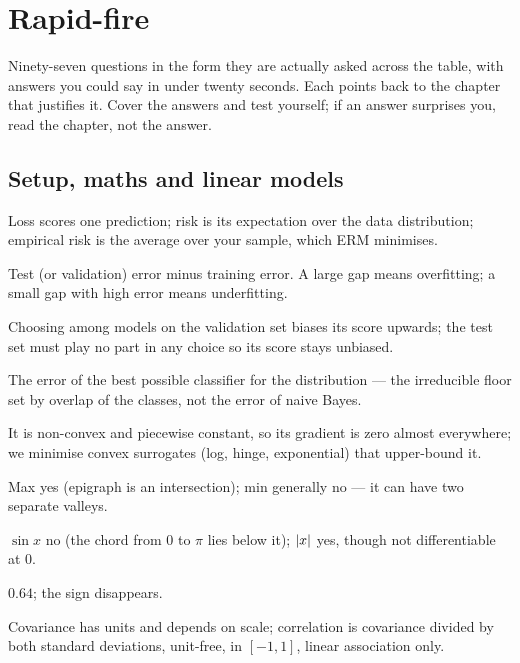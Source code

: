 \chapter{Rapid-fire}
\label{ch:rapid}
Ninety-seven questions in the form they are actually asked across the table, with answers you could say in under
twenty seconds. Each points back to the chapter that justifies it. Cover the answers and test yourself; if an
answer surprises you, read the chapter, not the answer.


{\small
	\section{Setup, maths and linear models}

	 Loss scores one prediction; risk is its expectation over the data distribution;
	empirical risk is the average over your sample, which ERM minimises.

	 Test (or validation) error minus training error. A large gap means
	overfitting; a small gap with high error means underfitting.

	 Choosing among models on the validation set biases its score upwards;
	the test set must play no part in any choice so its score stays unbiased.

	 The error of the best possible classifier for the distribution --- the irreducible
	floor set by overlap of the classes, not the error of naive Bayes.

	 It is non-convex and piecewise constant, so its gradient is
	zero almost everywhere; we minimise convex surrogates (log, hinge, exponential) that upper-bound it.

	 Max yes (epigraph is an intersection); min generally no ---
	it can have two separate valleys.

	 $\sin x$ no (the chord from $0$ to $\pi$ lies below it); $\left\lvert x \right\rvert$ yes, though not
	differentiable at $0$.

	 $0.64$; the sign disappears.

	 Covariance has units and depends on scale; correlation is covariance divided
	by both standard deviations, unit-free, in $[-1,1]$, linear association only.

}

